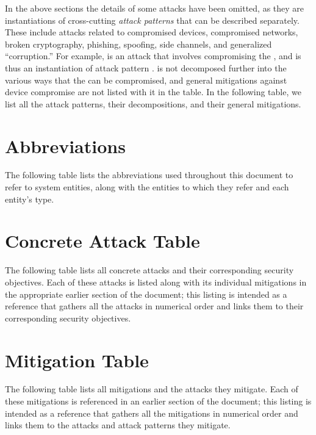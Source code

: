\documentclass[10pt,letterpaper]{article}
\begin{document}
In the above sections the details of some attacks have been omitted, as they are instantiations of cross-cutting \emph{attack patterns} that can be described separately. These include attacks related to compromised devices, compromised networks, broken cryptography, phishing, spoofing, side channels, and generalized ``corruption.'' For example, \RefFullATKBadDecryptionDeviceTAS{} is an attack that involves compromising the \RefNumCtxTAS{}, and is thus an instantiation of attack pattern \RefFullAPTNCompromisedDevice{}. \RefNumATKBadDecryptionDeviceTAS{} is not decomposed further into the various ways that the \RefNumCtxTAS{} can be compromised, and general mitigations against device compromise are not listed with it in the table. In the following table, we list all the attack patterns, their decompositions, and their general mitigations.



\appendix

\pagebreak
\section{Abbreviations}
\label{appendix:abbreviations}

The following table lists the abbreviations used throughout this document to refer to system entities, along with the entities to which they refer and each entity's type.



\pagebreak
\section{Concrete Attack Table}
\label{appendix:attacks}

The following table lists all concrete attacks and their corresponding security objectives. Each of these attacks is listed along with its individual mitigations in the appropriate earlier section of the document; this listing is intended as a reference that gathers all the attacks in numerical order and links them to their corresponding security objectives.



\pagebreak
\section{Mitigation Table}
\label{appendix:mitigations}

The following table lists all mitigations and the attacks they mitigate. Each of these mitigations is referenced in an earlier section of the document; this listing is intended as a reference that gathers all the mitigations in numerical order and links them to the attacks and attack patterns they mitigate.



\pagebreak
\printbibliography[heading=bibintoc]
\end{document}
